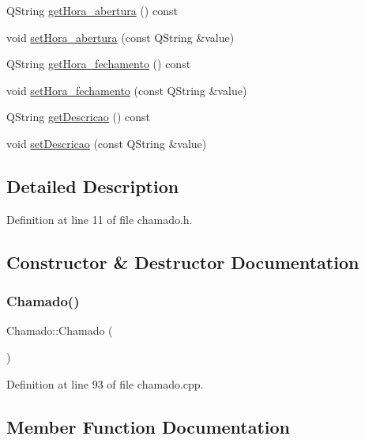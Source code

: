 \begin{DoxyCompactItemize}
\item 
Q\+String \hyperlink{class_chamado_a58fd1c5cf9693ccc2ebacc9e7b984de0}{get\+Hora\+\_\+abertura} () const
\item 
void \hyperlink{class_chamado_a2513e3474003230bee760aeb28da8188}{set\+Hora\+\_\+abertura} (const Q\+String \&value)
\item 
Q\+String \hyperlink{class_chamado_a8d6f16bed156bb8241d1068ebe962483}{get\+Hora\+\_\+fechamento} () const
\item 
void \hyperlink{class_chamado_a4517fc2b385ef3ed227289c3444a0208}{set\+Hora\+\_\+fechamento} (const Q\+String \&value)
\item 
Q\+String \hyperlink{class_chamado_aa7aeb5e538449b9a71271756d7b39d43}{get\+Descricao} () const
\item 
void \hyperlink{class_chamado_a970a71741ec450c40c48eb4babd2fec3}{set\+Descricao} (const Q\+String \&value)
\end{DoxyCompactItemize}


\subsection{Detailed Description}


Definition at line 11 of file chamado.\+h.



\subsection{Constructor \& Destructor Documentation}
\hypertarget{class_chamado_aeca5f123901cef6b33104291dc3b2fc0}{}\label{class_chamado_aeca5f123901cef6b33104291dc3b2fc0} 
\subsubsection{\texorpdfstring{Chamado()}{Chamado()}}
{\footnotesize\ttfamily Chamado\+::\+Chamado (\begin{DoxyParamCaption}{ }\end{DoxyParamCaption})}



Definition at line 93 of file chamado.\+cpp.



\subsection{Member Function Documentation}
\hypertarget{class_chamado_aa7aeb5e538449b9a71271756d7b39d43}{}\label{class_chamado_aa7aeb5e538449b9a71271756d7b39d43} 

